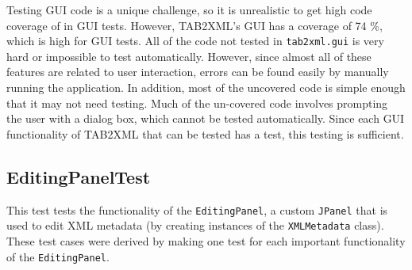 \documentclass[11pt]{article}
\begin{document}
Testing GUI code is a unique challenge, so it is unrealistic to get high code coverage of in GUI tests.  However, TAB2XML's GUI has a coverage of 74 \%, which is high for GUI tests.  All of the code not tested in \texttt{tab2xml.gui} is very hard or impossible to test automatically.  However, since almost all of these features are related to user interaction, errors can be found easily by manually running the application.  In addition, most of the uncovered code is simple enough that it may not need testing.  Much of the un-covered code involves prompting the user with a dialog box, which cannot be tested automatically.  Since each GUI functionality of TAB2XML that can be tested has a test, this testing is sufficient.
\subsection{EditingPanelTest}
\label{sec:orgcbd2143}
This test tests the functionality of the \texttt{EditingPanel}, a custom \texttt{JPanel} that is used to edit XML metadata (by creating instances of the \texttt{XMLMetadata} class).  These test cases were derived by making one test for each important functionality of the \texttt{EditingPanel}.
\end{document}
